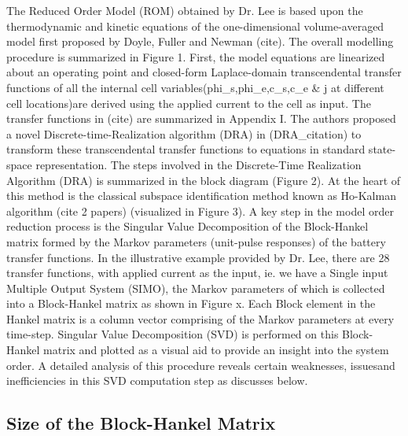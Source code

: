 The Reduced Order Model (ROM) obtained by Dr. Lee is based upon the
thermodynamic and kinetic equations of the one-dimensional volume-averaged
model first proposed by Doyle, Fuller and Newman (cite). The overall
modelling procedure is summarized in Figure 1. First, the model equations
are linearized about an operating point and closed-form Laplace-domain
transcendental transfer functions of all the internal cell variables(phi\_s,phi\_e,c\_s,c\_e
\& j at different cell locations)are derived using the applied current
to the cell as input. The transfer functions in (cite) are summarized
in Appendix I. The authors proposed a novel Discrete-time-Realization
algorithm (DRA) in (DRA\_citation) to transform these transcendental
transfer functions to equations in standard state-space representation.
The steps involved in the Discrete-Time Realization Algorithm (DRA)
is summarized in the block diagram (Figure 2). At the heart of this
method is the classical subspace identification method known as Ho-Kalman
algorithm (cite 2 papers) (visualized in Figure 3). A key step in
the model order reduction process is the Singular Value Decomposition
of the Block-Hankel matrix formed by the Markov parameters (unit-pulse
responses) of the battery transfer functions. In the illustrative
example provided by Dr. Lee, there are 28 transfer functions, with
applied current as the input, ie. we have a Single input Multiple
Output System (SIMO), the Markov parameters of which is collected
into a Block-Hankel matrix as shown in Figure x. Each Block element
in the Hankel matrix is a column vector comprising of the Markov parameters
at every time-step. Singular Value Decomposition (SVD) is performed
on this Block-Hankel matrix and plotted as a visual aid to provide
an insight into the system order. A detailed analysis of this procedure
reveals certain weaknesses, issuesand inefficiencies in this SVD computation
step as discusses below.

\subsection{Size of the Block-Hankel Matrix}


